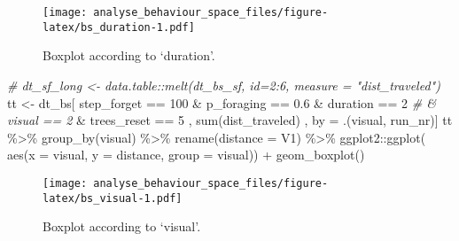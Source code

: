 \documentclass[
]{article}
\newenvironment{Shaded}{\begin{snugshade}}{\end{snugshade}}
\newcommand{\AttributeTok}[1]{\textcolor[rgb]{0.77,0.63,0.00}{#1}}
\newcommand{\CommentTok}[1]{\textcolor[rgb]{0.56,0.35,0.01}{\textit{#1}}}
\newcommand{\DecValTok}[1]{\textcolor[rgb]{0.00,0.00,0.81}{#1}}
\newcommand{\FloatTok}[1]{\textcolor[rgb]{0.00,0.00,0.81}{#1}}
\newcommand{\FunctionTok}[1]{\textcolor[rgb]{0.00,0.00,0.00}{#1}}
\newcommand{\NormalTok}[1]{#1}
\newcommand{\OtherTok}[1]{\textcolor[rgb]{0.56,0.35,0.01}{#1}}
\newcommand{\SpecialCharTok}[1]{\textcolor[rgb]{0.00,0.00,0.00}{#1}}
\begin{document}
\begin{figure}
\centering
\texttt{[image: analyse\_behaviour\_space\_files/figure-latex/bs\_duration-1.pdf]}
\caption{Boxplot according to `duration'.}
\end{figure}

\begin{Shaded}
\begin{Highlighting}[]
\CommentTok{\# dt\_sf\_long \textless{}{-} data.table::melt(dt\_bs\_sf, id=2:6, measure = "dist\_traveled")}
\NormalTok{tt }\OtherTok{\textless{}{-}}\NormalTok{ dt\_bs[ step\_forget }\SpecialCharTok{==} \DecValTok{100}
    \SpecialCharTok{\&}\NormalTok{ p\_foraging }\SpecialCharTok{==} \FloatTok{0.6}
    \SpecialCharTok{\&}\NormalTok{ duration }\SpecialCharTok{==} \DecValTok{2}
\CommentTok{\#    \& visual == 2}
    \SpecialCharTok{\&}\NormalTok{ trees\_reset }\SpecialCharTok{==} \DecValTok{5}
\NormalTok{    , }\FunctionTok{sum}\NormalTok{(dist\_traveled) , by }\OtherTok{=}\NormalTok{ .(visual, run\_nr)]}
\NormalTok{tt }\SpecialCharTok{\%\textgreater{}\%} \FunctionTok{group\_by}\NormalTok{(visual) }\SpecialCharTok{\%\textgreater{}\%} \FunctionTok{rename}\NormalTok{(}\AttributeTok{distance =}\NormalTok{ V1) }\SpecialCharTok{\%\textgreater{}\%} 
\NormalTok{ggplot2}\SpecialCharTok{::}\FunctionTok{ggplot}\NormalTok{( }\FunctionTok{aes}\NormalTok{(}\AttributeTok{x =}\NormalTok{ visual, }\AttributeTok{y =}\NormalTok{ distance, }\AttributeTok{group =}\NormalTok{ visual)) }\SpecialCharTok{+} \FunctionTok{geom\_boxplot}\NormalTok{()}
\end{Highlighting}
\end{Shaded}

\begin{figure}
\centering
\texttt{[image: analyse\_behaviour\_space\_files/figure-latex/bs\_visual-1.pdf]}
\caption{Boxplot according to `visual'.}
\end{figure}
\end{document}
